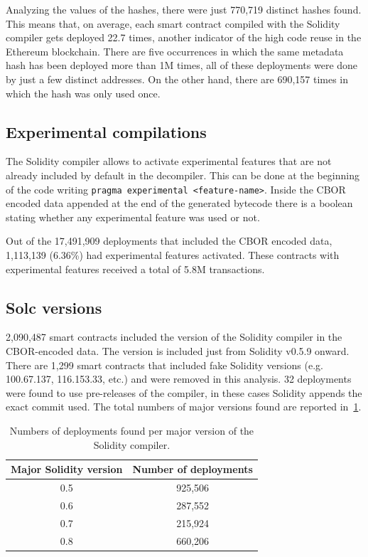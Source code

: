 Analyzing the values of the hashes, there were just 770,719 distinct hashes found. This means that, on average, each smart contract compiled with the Solidity compiler gets deployed 22.7 times, another indicator of the high code reuse in the Ethereum blockchain. There are five occurrences in which the same metadata hash has been deployed more than 1M times, all of these deployments were done by just a few distinct addresses. On the other hand, there are 690,157 times in which the hash was only used once.

\subsection{Experimental compilations}

The Solidity compiler allows to activate experimental features that are not already included by default in the decompiler. This can be done at the beginning of the code writing {\tt pragma experimental <feature-name>}. Inside the CBOR encoded data appended at the end of the generated bytecode there is a boolean stating whether any experimental feature was used or not.

Out of the 17,491,909 deployments that included the CBOR encoded data, 1,113,139 (6.36\%) had experimental features activated. These contracts with experimental features received a total of 5.8M transactions.

\subsection{Solc versions}

2,090,487 smart contracts included the version of the Solidity compiler in the CBOR-encoded data. The version is included just from Solidity v0.5.9 onward. There are 1,299 smart contracts that included fake Solidity versions (e.g. 100.67.137, 116.153.33, etc.) and were removed in this analysis. 32 deployments were found to use pre-releases of the compiler, in these cases Solidity appends the exact commit used. The total numbers of major versions found are reported in~\cref{table:solc-majors}.

\begin{table}[ht]
\centering
    \begin{threeparttable}
    \begin{tabular}{ c c } 
    \toprule
    \textbf{Major Solidity version} & \textbf{Number of deployments} \\
    \midrule
       0.5 & 925,506 \\ [1.2ex]
       0.6 & 287,552 \\ [1.2ex]
       0.7 & 215,924 \\ [1.2ex]
       0.8 & 660,206 \\ [1.2ex]
    \bottomrule
    \end{tabular}
    \end{threeparttable}
    \caption{Numbers of deployments found per major version of the Solidity compiler.}
    \label{table:solc-majors}
\end{table}

